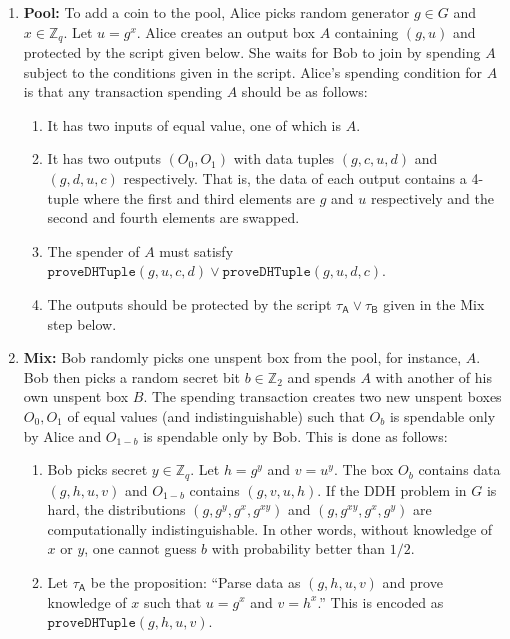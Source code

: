 \documentclass[11pt]{article}
\begin{document}
\begin{enumerate}
	\item \textbf{Pool:} To add a coin to the pool, Alice picks random generator $g\in G$ and $x\in \mathbb{Z}_q$. Let $u = g^{x}$. Alice creates an output box $A$ containing $(g, u)$ and protected by the script given below. She waits for Bob to join by spending $A$ subject to the conditions given in the script. 
	Alice's spending condition for $A$ is that any transaction spending $A$ should be as follows: 
	
	\begin{enumerate}
		\item It has two inputs of equal value, one of which is $A$. %
		\item It has two outputs $(O_0, O_1)$ with data tuples $(g, c, u, d)$ and $(g, d, u, c)$ respectively. That is, the data of each output contains a 4-tuple where the first and third elements are $g$ and $u$ respectively and the second and fourth elements are swapped. 
		\item The spender of $A$ must satisfy $\texttt{proveDHTuple}(g, u, c, d)\lor \texttt{proveDHTuple}(g, u, d, c)$.
		\item The outputs should be protected by the script $\tau_\textsf{A} \lor \tau_\textsf{B}$ given in the Mix step below.
	\end{enumerate}
	
	
	\item \textbf{Mix:} Bob randomly picks one unspent box from the pool, for instance, $A$. Bob then picks a random secret bit $b \in \mathbb{Z}_2$ and spends $A$ with another of his own unspent box $B$. The spending transaction creates two new unspent boxes $O_0, O_1$ of equal values (and indistinguishable) such that $O_b$ is spendable only by Alice and $O_{1-b}$ is spendable only by Bob. This is done as follows:
	
	\begin{enumerate}
		\item Bob picks secret $y\in \mathbb{Z}_q$. Let $h = {g}^{y}$ and $v = {u}^{y}$.  %
		The box $O_b$ contains data $(g, h, u, v)$ and $O_{1-b}$ contains $(g, v, u, h)$. If the DDH problem in $G$ is hard, the distributions $(g, {g}^{y}, {g}^{x}, {g}^{xy})$ and 
		$(g, {g}^{xy}, {g}^{x}, {g}^{y})$ are computationally indistinguishable. In other words, without knowledge of $x$ or $y$, one cannot guess $b$ with probability better than $1/2$.
		\item  Let 
		$\tau_\textsf{A}$ be the proposition: ``Parse data as $(g, h, u, v)$ and
		prove knowledge of $x$ such that $u = {g}^{x}$ and ${v} = {h}^{x}$.'' This is encoded as $\texttt{proveDHTuple}(g, h, u, v)$.
		

\end{enumerate}
\end{enumerate}
\end{document}
